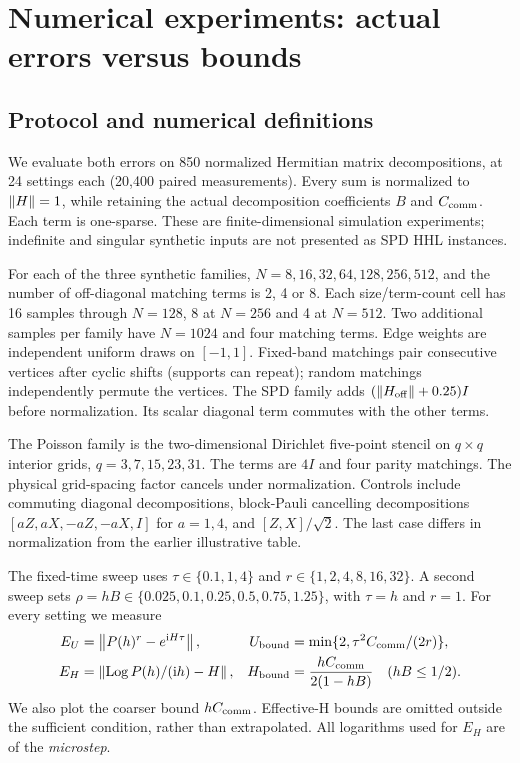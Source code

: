 \clearpage
\section{Numerical experiments: actual errors versus bounds}
\subsection{Protocol and numerical definitions}
We evaluate both errors on 850 normalized Hermitian matrix decompositions, at 24 settings each (20,400 paired measurements). Every sum is normalized to $\left\lVert H\right\rVert=1$, while retaining the actual decomposition coefficients $B$ and $C_{\mathrm{comm}}$. Each term is one-sparse. These are finite-dimensional simulation experiments; indefinite and singular synthetic inputs are not presented as SPD HHL instances.

\begin{center}\small\end{center}

For each of the three synthetic families, $N=8,16,32,64,128,256,512$, and the number of off-diagonal matching terms is 2, 4 or 8. Each size/term-count cell has 16 samples through $N=128$, 8 at $N=256$ and 4 at $N=512$. Two additional samples per family have $N=1024$ and four matching terms. Edge weights are independent uniform draws on $[-1,1]$. Fixed-band matchings pair consecutive vertices after cyclic shifts (supports can repeat); random matchings independently permute the vertices. The SPD family adds $(\left\lVert H_{\rm off}\right\rVert+0.25)I$ before normalization. Its scalar diagonal term commutes with the other terms.

The Poisson family is the two-dimensional Dirichlet five-point stencil on $q\times q$ interior grids, $q=3,7,15,23,31$. The terms are $4I$ and four parity matchings. The physical grid-spacing factor cancels under normalization. Controls include commuting diagonal decompositions, block-Pauli cancelling decompositions $[aZ,aX,-aZ,-aX,I]$ for $a=1,4$, and $[Z,X]/\sqrt2$. The last case differs in normalization from the earlier illustrative table.

The fixed-time sweep uses $\tau\in\{0.1,1,4\}$ and $r\in\{1,2,4,8,16,32\}$. A second sweep sets $\rho=hB\in\{0.025,0.1,0.25,0.5,0.75,1.25\}$, with $\tau=h$ and $r=1$. For every setting we measure
\begin{align}
 E_U&=\left\lVert P(h)^r-e^{\mathrm{i} H\tau}\right\rVert,&
 U_{\rm bound}&=\min\{2,\tau^2C_{\mathrm{comm}}/(2r)\},\\
 E_H&=\left\lVert \operatorname{Log}P(h)/(\mathrm{i} h)-H\right\rVert,&
 H_{\rm bound}&=\frac{hC_{\mathrm{comm}}}{2(1-hB)}\quad(hB\leq1/2).
\end{align}
We also plot the coarser bound $hC_{\mathrm{comm}}$. Effective-H bounds are omitted outside the sufficient condition, rather than extrapolated. All logarithms used for $E_H$ are of the \emph{microstep}.

